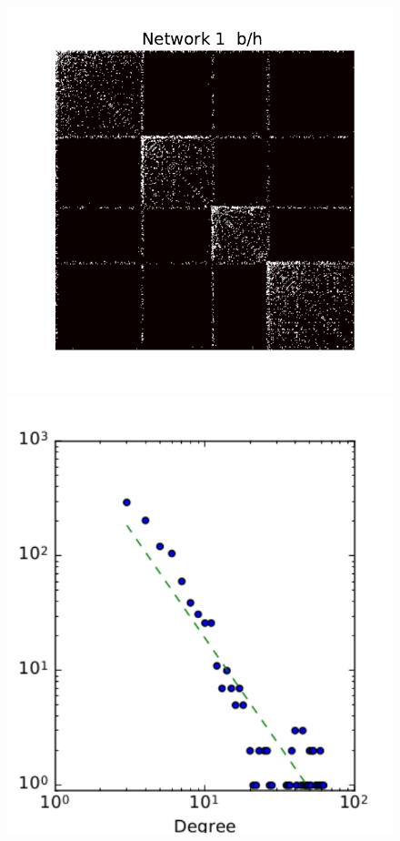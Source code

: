
\begin{figure}[h]
    \centering

    \advance\leftskip-3.5cm
    \advance\rightskip-4cm
	
	\includegraphics[scale=0.32]{img/g1}
	\endminipage
	\includegraphics[scale=0.32]{img/g1_d}

\end{figure}
